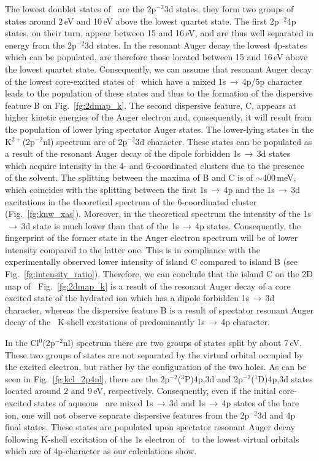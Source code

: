 The lowest doublet states of \ki~are the 2p$^{-2}$3d states, they form two groups of states around 2\,eV and 10\,eV above the lowest quartet state. The first 2p$^{-2}$4p states, on their turn, appear between 15 and 16\,eV, and are thus well separated in energy from the 2p$^{-2}$3d states. In the resonant Auger decay the lowest 4p-states which can be populated, are therefore those located between 15 and 16\,eV above the lowest quartet state. Consequently, we can assume that resonant Auger decay of the lowest core-excited states of \ki~which have a mixed 1s$\,\rightarrow\,$4p/5p character leads to the population of these states and thus to the formation of the dispersive feature B on Fig.\ \ref{fg:2dmap_k}. The second dispersive feature, C, appears at higher kinetic energies of the Auger electron and, consequently, it will result from the population of lower lying spectator Auger states. The lower-lying states in the K$^{2+}$(2p$^{-2}$nl) spectrum are of 2p$^{-2}$3d character. These states can be populated as a result of the resonant Auger decay of the dipole forbidden 1s$\,\rightarrow\,$3d states which acquire intensity in the 4- and 6-coordinated clusters due to the presence of the solvent. The splitting between the maxima of B and C is of $\sim$400\,meV, which coincides with the splitting between the first 1s$\,\rightarrow\,$4p and the 1s$\,\rightarrow\,$3d excitations in the theoretical spectrum of the 6-coordinated cluster (Fig.\ \ref{fg:knw_xas}). Moreover, in the theoretical spectrum the intensity of the 1s$\,\rightarrow\,$3d state is much lower than that of the 1s$\,\rightarrow\,$4p states. Consequently, the fingerprint of the former state in the Auger electron spectrum will be of lower intensity compared to the latter one. This is in compliance with the experimentally observed lower intensity of island C compared to island B (see Fig.\ \ref{fg:intensity_ratio}). Therefore, we can conclude that the island C on the 2D map of \ki~Fig.\ \ref{fg:2dmap_k} is a result of the resonant Auger decay of a core excited state of the hydrated ion which has a dipole forbidden 1s$\,\rightarrow\,$3d character, whereas the dispersive feature B is a result of spectator resonant Auger decay of the \ki~K-shell excitations of predominantly 1s$\,\rightarrow\,$4p character.


In the Cl$^{0}$(2p$^{-2}$nl) spectrum there are two groups of states split by about 7\,eV. These two groups of states are not separated by the virtual orbital occupied by the excited electron, but rather by the configuration of the two holes. As can be seen in Fig.\ \ref{fg:kcl_2p4nl}, there are the 2p$^{-2}$($^3$P)4p,3d and 2p$^{-2}$($^1$D)4p,3d states located around 2 and 9\,eV, respectively. Consequently, even if the initial core-excited states of aqueous \cli~are mixed 1s$\,\rightarrow\,$3d and 1s$\,\rightarrow\,$4p states of the bare ion, one will not observe separate dispersive features from the 2p$^{-2}$3d and 4p final states. These states are populated upon spectator resonant Auger decay following K-shell excitation of the 1s electron of \cli~to the lowest virtual orbitals which are of 4p-character as our calculations show.


